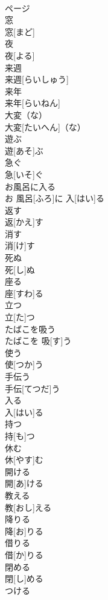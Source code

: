 \documentclass[8pt]{extreport}
\begin{document}
\begin{CJK}{UTF8}{min}
\\	ページ
\\	窓	
\\	窓[まど]
\\	夜	
\\	夜[よる]
\\	来週	
\\	来週[らいしゅう]
\\	来年	
\\	来年[らいねん]
\\	大変（な）	
\\	大変[たいへん]（な）
\\	遊ぶ	
\\	遊[あそ]ぶ
\\	急ぐ	
\\	急[いそ]ぐ
\\	お風呂に入る	
\\	お 風呂[ふろ]に 入[はい]る
\\	返す	
\\	返[かえ]す
\\	消す	
\\	消[け]す
\\	死ぬ	
\\	死[し]ぬ
\\	座る	
\\	座[すわ]る
\\	立つ	
\\	立[た]つ
\\	たばこを吸う	
\\	たばこを 吸[す]う
\\	使う	
\\	使[つか]う
\\	手伝う	
\\	手伝[てつだ]う
\\	入る	
\\	入[はい]る
\\	持つ	
\\	持[も]つ
\\	休む	
\\	休[やす]む
\\	開ける	
\\	開[あ]ける
\\	教える	
\\	教[おし]える
\\	降りる	
\\	降[お]りる
\\	借りる	
\\	借[か]りる
\\	閉める	
\\	閉[し]める
\\	つける	

\end{CJK}
\end{document}
